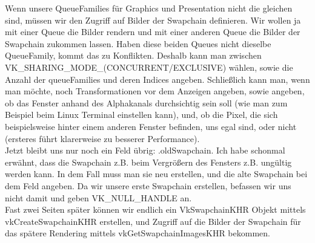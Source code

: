 \documentclass[11pt,a4paper]{report}
\begin{document}
Wenn unsere QueueFamilies für Graphics und Presentation nicht die gleichen sind, müssen wir den Zugriff auf Bilder der Swapchain definieren. Wir wollen ja mit einer Queue die Bilder rendern und mit einer anderen Queue die Bilder der Swapchain zukommen lassen. Haben diese beiden Queues nicht dieselbe QueueFamily, kommt das zu Konflikten. Deshalb kann man zwischen VK\_SHARING\_MODE\_(CONCURRENT/EXCLUSIVE) wählen, sowie die Anzahl der queueFamilies und deren Indices angeben. Schließlich kann man, wenn man möchte, noch Transformationen vor dem Anzeigen angeben, sowie angeben, ob das Fenster anhand des Alphakanals durchsichtig sein soll (wie man zum Beispiel beim Linux Terminal einstellen kann), und, ob die Pixel, die sich beispielsweise hinter einem anderen Fenster befinden, uns egal sind, oder nicht (ersteres führt klarerweise zu besserer Performance).\\
Jetzt bleibt uns nur noch ein Feld übrig: .oldSwapchain. Ich habe schonmal erwähnt, dass die Swapchain z.B. beim Vergrößern des Fensters z.B. ungültig werden kann. In dem Fall muss man sie neu erstellen, und die alte Swapchain bei dem Feld angeben. Da wir unsere erste Swapchain erstellen, befassen wir uns nicht damit und geben VK\_NULL\_HANDLE an.\\
Fast zwei Seiten später können wir endlich ein VkSwapchainKHR Objekt mittels vkCreateSwapchainKHR erstellen, und Zugriff auf die Bilder der Swapchain für das spätere Rendering mittels vkGetSwapchainImagesKHR bekommen.
\end{document}
